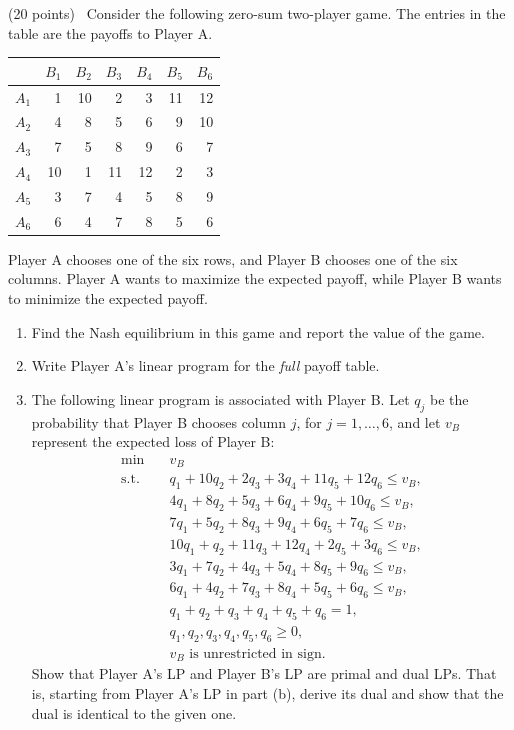 \documentclass[11pt,letterpaper]{article}
\newenvironment{examquestion}[2]{%
  \clearpage
  \begin{list}{}{%
    \setlength{\leftmargin}{2.15em}%
    \setlength{\labelwidth}{1.55em}%
    \setlength{\labelsep}{0.60em}%
    \setlength{\itemindent}{0pt}%
    \setlength{\listparindent}{0pt}%
    \setlength{\parsep}{0.42em}%
    \setlength{\topsep}{0pt}%
  }
  \item[\hfill #1.] (#2 points)\ 
}{%
  \end{list}
}
\begin{document}
\begin{examquestion}{2}{20}
Consider the following zero-sum two-player game. The entries in the table are the
payoffs to Player A.

\begin{center}
\begin{tabular}{c|rrrrrr}
&$B_1$&$B_2$&$B_3$&$B_4$&$B_5$&$B_6$\\ \hline
$A_1$&1&10&2&3&11&12\\
$A_2$&4&8&5&6&9&10\\
$A_3$&7&5&8&9&6&7\\
$A_4$&10&1&11&12&2&3\\
$A_5$&3&7&4&5&8&9\\
$A_6$&6&4&7&8&5&6
\end{tabular}
\end{center}

Player A chooses one of the six rows, and Player B chooses one of the six columns.
Player A wants to maximize the expected payoff, while Player B wants to minimize the
expected payoff.

\begin{enumerate}[label=(\alph*),leftmargin=2.2em]
  \item Find the Nash equilibrium in this game and report the value of the game.
  \item Write Player A's linear program for the \emph{full} payoff table.
  \item The following linear program is associated with Player B. Let $q_j$ be the
  probability that Player B chooses column $j$, for $j=1,\ldots,6$, and let $v_B$
  represent the expected loss of Player B:
  \[
  \begin{aligned}
  \min\quad &v_B\\
  \text{s.t.}\quad
  &q_1+10q_2+2q_3+3q_4+11q_5+12q_6\le v_B,\\
  &4q_1+8q_2+5q_3+6q_4+9q_5+10q_6\le v_B,\\
  &7q_1+5q_2+8q_3+9q_4+6q_5+7q_6\le v_B,\\
  &10q_1+q_2+11q_3+12q_4+2q_5+3q_6\le v_B,\\
  &3q_1+7q_2+4q_3+5q_4+8q_5+9q_6\le v_B,\\
  &6q_1+4q_2+7q_3+8q_4+5q_5+6q_6\le v_B,\\
  &q_1+q_2+q_3+q_4+q_5+q_6=1,\\
  &q_1,q_2,q_3,q_4,q_5,q_6\ge0,\\
  &v_B\text{ is unrestricted in sign.}
  \end{aligned}
  \]
  Show that Player A's LP and Player B's LP are primal and dual LPs. That is,
  starting from Player A's LP in part (b), derive its dual and show that the dual
  is identical to the given one.
\end{enumerate}


\end{examquestion}
\end{document}
